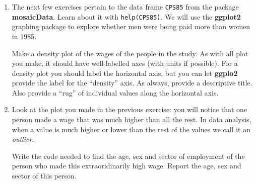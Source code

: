 \documentclass[]{book}
\makeatletter
\newenvironment{Shaded}{\begin{snugshade}}{\end{snugshade}}
\newcommand{\KeywordTok}[1]{\textcolor[rgb]{0.13,0.29,0.53}{\textbf{{#1}}}}
\newcommand{\DataTypeTok}[1]{\textcolor[rgb]{0.13,0.29,0.53}{{#1}}}
\newcommand{\DecValTok}[1]{\textcolor[rgb]{0.00,0.00,0.81}{{#1}}}
\newcommand{\StringTok}[1]{\textcolor[rgb]{0.31,0.60,0.02}{{#1}}}
\newcommand{\NormalTok}[1]{{#1}}
\newenvironment{kframe}{%
\medskip{}
\setlength{\fboxsep}{.8em}
 \def\at@end@of@kframe{}%
 \ifinner\ifhmode%
  \def\at@end@of@kframe{\end{minipage}}%
  \begin{minipage}{\columnwidth}%
 \fi\fi%
 \def\FrameCommand##1{\hskip\@totalleftmargin \hskip-\fboxsep
 \colorbox{shadecolor}{##1}\hskip-\fboxsep
     \hskip-\linewidth \hskip-\@totalleftmargin \hskip\columnwidth}%
 \MakeFramed {\advance\hsize-\width
   \@totalleftmargin\z@ \linewidth\hsize
   \@setminipage}}%
 {\par\unskip\endMakeFramed%
 \at@end@of@kframe}
\renewenvironment{Shaded}{\begin{kframe}}{\end{kframe}}
\theoremstyle{definition}
\theoremstyle{definition}
\theoremstyle{remark}
\makeatother
\begin{document}
{\begin{enumerate}
  \textbf{You may NOT use \texttt{rowSums()} or \texttt{colSums()} in
  the code for your function.} A typical example of use should look like
  this:

\begin{Shaded}
\begin{Highlighting}[]
\NormalTok{myMatrix <-}\StringTok{ }\KeywordTok{matrix}\NormalTok{(}\DecValTok{1}\NormalTok{:}\DecValTok{24}\NormalTok{, }\DataTypeTok{nrow =} \DecValTok{6}\NormalTok{)}
\KeywordTok{dimSum}\NormalTok{(myMatrix, }\StringTok{"c"}\NormalTok{)}
\end{Highlighting}
\end{Shaded}

\begin{verbatim}
## [1]  21  57  93 129
\end{verbatim}
\item
  The next few exercises pertain to the data frame \texttt{CPS85} from
  the package \textbf{mosaicData}. Learn about it with
  \texttt{help(CPS85)}. We will use the \textbf{ggplot2} graphing
  package to explore whether men were being paid more than women in
  1985.

  Make a density plot of the wages of the people in the study. As with
  all plot you make, it should have well-labelled axes (with units if
  possible). For a density plot you should label the horizontal axis,
  but you can let \textbf{ggplo2} provide the label for the ``density''
  axis. As always, provide a descriptive title. Also provide a ``rug''
  of individual values along the horizontal axis.
\item
  Look at the plot you made in the previous exercise: you will notice
  that one person made a wage that was much higher than all the rest. In
  data analysis, when a value is much higher or lower than the rest of
  the values we call it an \emph{outlier}.

  Write the code needed to find the age, sex and sector of employment of
  the person who made this extraoridinarily high wage. Report the age,
  sex and sector of this person.


\end{enumerate}}
\end{document}
